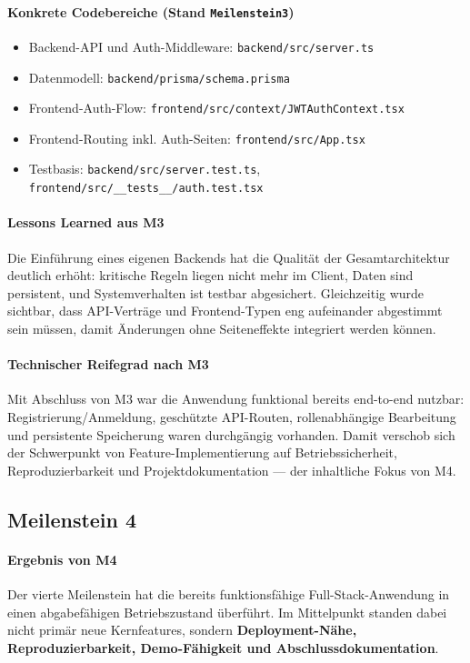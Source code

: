 \paragraph{Konkrete Codebereiche (Stand \texttt{Meilenstein3})}
\begin{itemize}
  \item Backend-API und Auth-Middleware: \texttt{backend/src/server.ts}
  \item Datenmodell: \texttt{backend/prisma/schema.prisma}
  \item Frontend-Auth-Flow: \texttt{frontend/src/context/JWTAuthContext.tsx}
  \item Frontend-Routing inkl. Auth-Seiten: \texttt{frontend/src/App.tsx}
  \item Testbasis: \texttt{backend/src/server.test.ts},
  \texttt{frontend/src/\_\_tests\_\_/auth.test.tsx}
\end{itemize}

\paragraph{Lessons Learned aus M3}
Die Einführung eines eigenen Backends hat die Qualität der
Gesamtarchitektur deutlich erhöht:
kritische Regeln liegen nicht mehr im Client, Daten sind persistent, und
Systemverhalten ist testbar abgesichert.
Gleichzeitig wurde sichtbar, dass API-Verträge und Frontend-Typen eng
aufeinander abgestimmt sein müssen, damit Änderungen ohne Seiteneffekte
integriert werden können.

\paragraph{Technischer Reifegrad nach M3}
Mit Abschluss von M3 war die Anwendung funktional bereits end-to-end nutzbar:
Registrierung/Anmeldung, geschützte API-Routen, rollenabhängige Bearbeitung und
persistente Speicherung waren durchgängig vorhanden.
Damit verschob sich der Schwerpunkt von Feature-Implementierung auf
Betriebssicherheit, Reproduzierbarkeit und Projektdokumentation --- der
inhaltliche Fokus von M4.

\subsection{Meilenstein 4}

\paragraph{Ergebnis von M4}
Der vierte Meilenstein hat die bereits funktionsfähige Full-Stack-Anwendung in
einen abgabefähigen Betriebszustand überführt.
Im Mittelpunkt standen dabei nicht primär neue Kernfeatures, sondern
\textbf{Deployment-Nähe, Reproduzierbarkeit, Demo-Fähigkeit und Abschlussdokumentation}.

